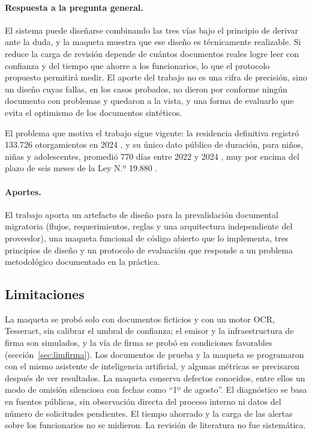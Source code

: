 \documentclass[11pt,a4paper]{article}
\begin{document}
\paragraph{Respuesta a la pregunta general.} El sistema puede diseñarse combinando las tres vías bajo el principio de derivar ante la duda, y la maqueta muestra que ese diseño es técnicamente realizable. Si reduce la carga de revisión depende de cuántos documentos reales logre leer con confianza y del tiempo que ahorre a los funcionarios, lo que el protocolo propuesto permitirá medir. El aporte del trabajo no es una cifra de precisión, sino un diseño cuyas fallas, en los casos probados, no dieron por conforme ningún documento con problemas y quedaron a la vista, y una forma de evaluarlo que evita el optimismo de los documentos sintéticos.

El problema que motiva el trabajo sigue vigente: la residencia definitiva registró 133.726 otorgamientos en 2024 \cite{sermig2025}, y su único dato público de duración, para niños, niñas y adolescentes, promedió 770 días entre 2022 y 2024 \cite{defensoria2026}, muy por encima del plazo de seis meses de la Ley N.º 19.880 \cite{ley19880}.

\paragraph{Aportes.} El trabajo aporta un artefacto de diseño para la prevalidación documental migratoria (flujos, requerimientos, reglas y una arquitectura independiente del proveedor), una maqueta funcional de código abierto que lo implementa, tres principios de diseño y un protocolo de evaluación que responde a un problema metodológico documentado en la práctica.

\subsection{Limitaciones}
La maqueta se probó solo con documentos ficticios y con un motor OCR, Tesseract, sin calibrar el umbral de confianza; el emisor y la infraestructura de firma son simulados, y la vía de firma se probó en condiciones favorables (sección~\ref{sec:limfirma}). Los documentos de prueba y la maqueta se programaron con el mismo asistente de inteligencia artificial, y algunas métricas se precisaron después de ver resultados. La maqueta conserva defectos conocidos, entre ellos un modo de omisión silenciosa con fechas como ``1º de agosto''. El diagnóstico se basa en fuentes públicas, sin observación directa del proceso interno ni datos del número de solicitudes pendientes. El tiempo ahorrado y la carga de las alertas sobre los funcionarios no se midieron. La revisión de literatura no fue sistemática.
\end{document}
